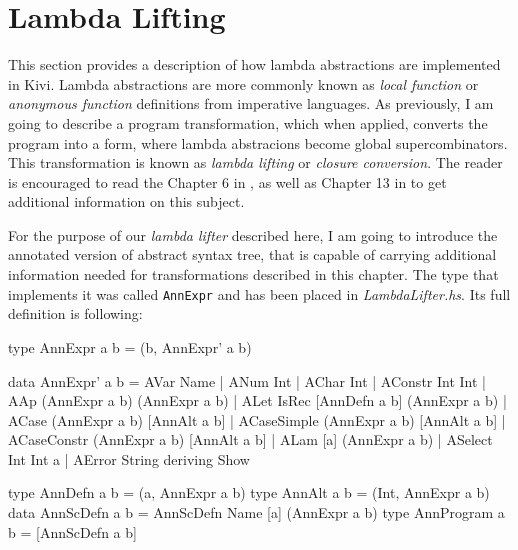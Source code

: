 \documentclass[12pt,a4paper]{report}
\begin{document}

\section{Lambda Lifting}
\label{sec:lambda_lifting}
This section provides a description of how lambda abstractions are implemented
in Kivi. Lambda abstractions are more commonly known as \textit{local function}
or \textit{anonymous function} definitions from imperative languages. As
previously, I am going to describe a program transformation, which when
applied, converts the program into a form, where lambda abstracions become
global supercombinators. This transformation is known as \textit{lambda
lifting} or \textit{closure conversion}. The reader is encouraged to read the
Chapter 6 in \cite{JonLes00}, as well as Chapter 13 in \cite{Jon87} to get
additional information on this subject.

For the purpose of our \textit{lambda lifter} described here, I am going to
introduce the annotated version of abstract syntax tree, that is capable of
carrying additional information needed for transformations described in this
chapter. The type that implements it was called \texttt{AnnExpr} and has
been placed in \textit{LambdaLifter.hs}. Its full definition is following:

\vspace*{0.2in}
\begin{code}[style=haskell,label=lst:annotated_expression]
  type AnnExpr a b = (b, AnnExpr' a b)

  data AnnExpr' a b = AVar Name
                    | ANum Int
                    | AChar Int
                    | AConstr Int Int
                    | AAp (AnnExpr a b) (AnnExpr a b)
                    | ALet IsRec [AnnDefn a b] (AnnExpr a b)
                    | ACase (AnnExpr a b) [AnnAlt a b]
                    | ACaseSimple (AnnExpr a b) [AnnAlt a b]
                    | ACaseConstr (AnnExpr a b) [AnnAlt a b]
                    | ALam [a] (AnnExpr a b)
                    | ASelect Int Int a
                    | AError String
      deriving Show

  type AnnDefn a b = (a, AnnExpr a b)
  type AnnAlt a b = (Int, AnnExpr a b)
  data AnnScDefn a b = AnnScDefn Name [a] (AnnExpr a b)
  type AnnProgram a b = [AnnScDefn a b]
\end{code}
\end{document}
